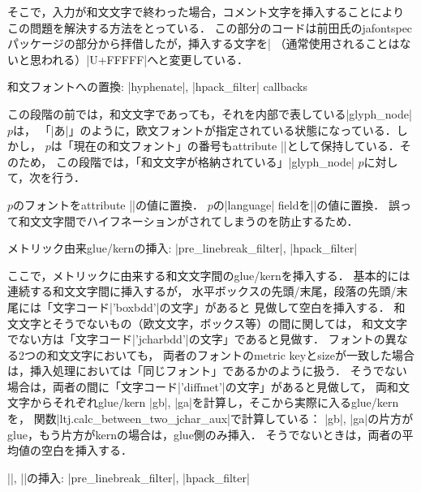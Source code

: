 そこで，入力が和文文字で終わった場合，コメント文字を挿入することにより
この問題を解決する方法をとっている．
この部分のコードは前田氏のjafontspecパッケージの部分から拝借したが，挿入する文字を|%
（通常使用されることはないと思われる）|U+FFFFF|へと変更している．

\item 和文フォントへの置換: |hyphenate|, |hpack_filter| callbacks

この段階の前では，和文文字であっても，それを内部で表している|glyph_node| $p$は，
「|\temrm あ|」のように，欧文フォントが指定されている状態になっている．しかし，
$p$は「現在の和文フォント」の番号もattribute |\luatexja@curjfn|として保持している．そのため，
この段階では，「和文文字が格納されている」|glyph_node| $p$に対して，次を行う．

\itemitem $p$のフォントをattribute |\luatexja@curjfn|の値に置換．
\itemitem $p$の|language| fieldを|\luatexja@japanese|の値に置換．
誤って和文文字間でハイフネーションがされてしまうのを防止するため．

\item メトリック由来glue/kernの挿入: |pre_linebreak_filter|, |hpack_filter|

ここで，メトリックに由来する和文文字間のglue/kernを挿入する．
基本的には連続する和文文字間に挿入するが，
\itemitem 水平ボックスの先頭/末尾，段落の先頭/末尾には「文字コード|'boxbdd'|の文字」があると
見做して空白を挿入する．
\itemitem 和文文字とそうでないもの（欧文文字，ボックス等）の間に関しては，
和文文字でない方は「文字コード|'jcharbdd'|の文字」であると見做す．
\itemitem フォントの異なる2つの和文文字においても，
両者のフォントのmetric keyとsizeが一致した場合は，挿入処理においては「同じフォント」であるかのように扱う．
\itemitem  そうでない場合は，両者の間に「文字コード|'diffmet'|の文字」があると見做して，
両和文文字からそれぞれglue/kern |gb|, |ga|を計算し，そこから実際に入るglue/kernを，
関数|ltj.calc_between_two_jchar_aux|で計算している：
\itemT |gb|, |ga|の片方がglue，もう片方がkernの場合は，glue側のみ挿入．
\itemT そうでないときは，両者の平均値の空白を挿入する．

\item |\kanjiskip|, |\xkanjiskip|の挿入: |pre_linebreak_filter|, |hpack_filter|


